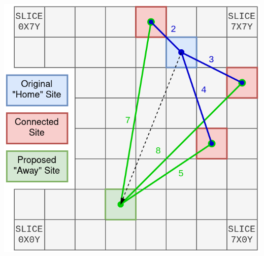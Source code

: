 {
    \centering
    \includegraphics[width=\columnwidth]{figures/placement/moveSingleSite.png}
    \label{fig:moveSingleSite}
}




